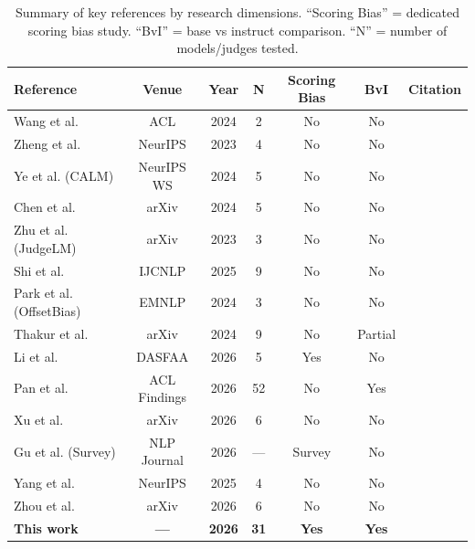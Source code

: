 \begin{table}[h]
\centering\small
\caption{Summary of key references by research dimensions. ``Scoring Bias'' = dedicated scoring bias study. ``BvI'' = base vs instruct comparison. ``N'' = number of models/judges tested.}
\label{tab:ref_summary}
\begin{tabular}{lcccccc}
\toprule
\textbf{Reference} & \textbf{Venue} & \textbf{Year} & \textbf{N} & \textbf{Scoring Bias} & \textbf{BvI} & \textbf{Citation} \\
\midrule
Wang et al. & ACL & 2024 & 2 & No & No & \cite{wang2023large} \\
Zheng et al. & NeurIPS & 2023 & 4 & No & No & \cite{zheng2023judging} \\
Ye et al. (CALM) & NeurIPS WS & 2024 & 5 & No & No & \cite{ye2024justice} \\
Chen et al. & arXiv & 2024 & 5 & No & No & \cite{chen2024humans} \\
Zhu et al. (JudgeLM) & arXiv & 2023 & 3 & No & No & \cite{zhu2023judgelm} \\
Shi et al. & IJCNLP & 2025 & 9 & No & No & \cite{shi2024position} \\
Park et al. (OffsetBias) & EMNLP & 2024 & 3 & No & No & \cite{park2024offsetbias} \\
Thakur et al. & arXiv & 2024 & 9 & No & Partial & \cite{thakur2024judging} \\
Li et al. & DASFAA & 2026 & 5 & Yes & No & \cite{li2025scoring} \\
Pan et al. & ACL Findings & 2026 & 52 & No & Yes & \cite{pan2025user} \\
Xu et al. & arXiv & 2026 & 6 & No & No & \cite{xu2026position} \\
Gu et al. (Survey) & NLP Journal & 2026 & --- & Survey & No & \cite{gu2024survey} \\
Yang et al. & NeurIPS & 2025 & 4 & No & No & \cite{yang2025debiasing} \\
Zhou et al. & arXiv & 2026 & 6 & No & No & \cite{zhou2026robust} \\
\midrule
\textbf{This work} & \textbf{---} & \textbf{2026} & \textbf{31} & \textbf{Yes} & \textbf{Yes} & \cite{samba2026scoring} \\
\bottomrule
\end{tabular}
\end{table}
